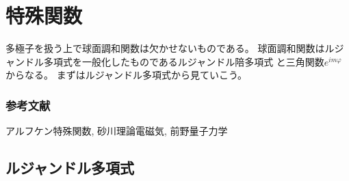 \documentclass[../master.tex]{subfiles}
\begin{document}
\chapter{特殊関数}
多極子を扱う上で球面調和関数は欠かせないものである。
球面調和関数はルジャンドル多項式を一般化したものであるルジャンドル陪多項式
と三角関数\(e^{im\varphi}\)からなる。
まずはルジャンドル多項式から見ていこう。
\subsection*{参考文献}
アルフケン特殊関数\cite{Arfken}, 砂川理論電磁気\cite{Sunakawa}, 前野量子力学\cite{Maeno_QM}

\section{ルジャンドル多項式}
\end{document}
